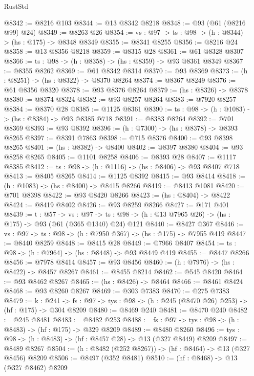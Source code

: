 \begin{lexlean}{RustStd}
\begin{coremodule}
@8342 := @8216 @103
@8344 := @13 @8342 @8218
@8348 := @93 (@61 (@8216 @99) @24)
@8349 := @8263 @26
@8354 := {vs : @97} -> {ts : @98} -> (h : @8344) -> (hs : @175) -> @8348 @8349
@8355 := @8341 @8255
@8356 := @8216 @24
@8358 := @13 @8356 @8218
@8359 := @8315 @28
@8361 := @61 @8328 @8307
@8366 := {ts : @98} -> (h : @8358) -> (hs : @8359) -> @93 @8361 @8349
@8367 := @8355 @8262
@8369 := @61 @8342 @8314
@8370 := @93 @8369
@8373 := (h : @8251) -> (hs : @8322) -> @8370 @8264
@8374 := @8367 @8249
@8376 := @61 @8356 @8320
@8378 := @93 @8376 @8264
@8379 := (hs : @8326) -> @8378
@8380 := @8374 @8324
@8382 := @93 @8257 @8264
@8383 := @7920 @8257
@8384 := @8370 @28
@8385 := @1125 @8361
@8390 := {ts : @98} -> (h : @1083) -> (hs : @8384) -> @93 @8385 @718
@8391 := @8383 @8264
@8392 := @701 @8369
@8393 := @93 @8392
@8396 := (h : @7300) -> (hs : @8378) -> @8393 @8265
@8397 := @8391 @7863
@8398 := @715 @8376
@8400 := @93 @8398 @8265
@8401 := (hs : @8382) -> @8400
@8402 := @8397 @8380
@8404 := @93 @8258 @8265
@8405 := @1101 @8258
@8406 := @8393 @28
@8407 := @1117 @8385
@8412 := {ts : @98} -> (h : @1116) -> (hs : @8406) -> @93 @8407 @718
@8413 := @8405 @8265
@8414 := @1125 @8392
@8415 := @93 @8414
@8418 := (h : @1083) -> (hs : @8400) -> @8415 @8266
@8419 := @8413 @1081
@8420 := @701 @8398
@8422 := @93 @8420 @8266
@8423 := (hs : @8404) -> @8422
@8424 := @8419 @8402
@8426 := @93 @8259 @8266
@8427 := @171 @401
@8439 := {t : @57} ->
  {vs : @97} -> {ts : @98} -> (h : @13 @7965 @26) -> (hs : @175) -> @93 (@61 (@365 @1340) @24) @121
@8440 := @8427 @367
@8446 := {vs : @97} -> {ts : @98} -> (h : @7950 @367) -> (hs : @175) -> @7955 @419
@8447 := @8440 @8259
@8448 := @8415 @28
@8449 := @7966 @8407
@8454 := {ts : @98} -> (h : @7964) -> (hs : @8448) -> @93 @8449 @419
@8455 := @8447 @8266
@8456 := @7978 @8414
@8457 := @93 @8456
@8460 := (h : @7976) -> (hs : @8422) -> @8457 @8267
@8461 := @8455 @8214
@8462 := @545 @8420
@8464 := @93 @8462 @8267
@8465 := (hs : @8426) -> @8464
@8466 := @8461 @8424
@8468 := @93 @8260 @8267
@8469 := @303 @7383
@8470 := @275 @7383
@8479 := {k : @241} ->
  {fs : @97} -> {tys : @98} -> (h : @245 (@8470 @26) @253) -> (hf : @175) -> @304 @8209
@8480 := @8469 @240
@8481 := @8470 @240
@8482 := @245 @8481
@8483 := @8482 @253
@8488 := {fs : @97} -> {tys : @98} -> (h : @8483) -> (hf : @175) -> @329 @8209
@8489 := @8480 @8260
@8496 := {tys : @98} -> (h : @8483) -> (hf : @8457 @28) -> @13 (@327 @8449) @8209
@8497 := @8489 @8267
@8504 := (h : @8482 (@252 @8267)) -> (hf : @8464) -> @13 (@327 @8456) @8209
@8506 := @8497 (@352 @8481)
@8510 := (hf : @8468) -> @13 (@327 @8462) @8209

\end{coremodule}
\end{lexlean}
